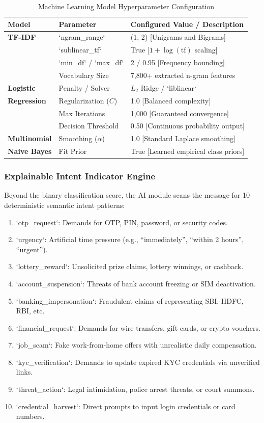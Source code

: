 \documentclass[conference]{IEEEtran}
\begin{document}
\begin{table}[!t]
\centering
\caption{Machine Learning Model Hyperparameter Configuration}
\label{tab:model_config}
\begin{tabular}{|l|l|p{4.5cm}|}
\hline
\textbf{Model} & \textbf{Parameter} & \textbf{Configured Value / Description} \\
\hline
\textbf{TF-IDF} & `ngram\_range` & (1, 2) [Unigrams and Bigrams] \\
& `sublinear\_tf` & True [$1 + \log(\text{tf})$ scaling] \\
& `min\_df` / `max\_df` & 2 / 0.95 [Frequency bounding] \\
& Vocabulary Size & 7,800+ extracted n-gram features \\
\hline
\textbf{Logistic} & Penalty / Solver & $L_2$ Ridge / `liblinear` \\
\textbf{Regression} & Regularization ($C$) & 1.0 [Balanced complexity] \\
& Max Iterations & 1,000 [Guaranteed convergence] \\
& Decision Threshold & 0.50 [Continuous probability output] \\
\hline
\textbf{Multinomial} & Smoothing ($\alpha$) & 1.0 [Standard Laplace smoothing] \\
\textbf{Naive Bayes} & Fit Prior & True [Learned empirical class priors] \\
\hline
\end{tabular}
\end{table}

\subsubsection{Explainable Intent Indicator Engine}
Beyond the binary classification score, the AI module scans the message for 10 deterministic semantic intent patterns:
\begin{enumerate}
    \item `otp_request`: Demands for OTP, PIN, password, or security codes.
    \item `urgency`: Artificial time pressure (e.g., ``immediately'', ``within 2 hours'', ``urgent'').
    \item `lottery_reward`: Unsolicited prize claims, lottery winnings, or cashback.
    \item `account_suspension`: Threats of bank account freezing or SIM deactivation.
    \item `banking_impersonation`: Fraudulent claims of representing SBI, HDFC, RBI, etc.
    \item `financial_request`: Demands for wire transfers, gift cards, or crypto vouchers.
    \item `job_scam`: Fake work-from-home offers with unrealistic daily compensation.
    \item `kyc_verification`: Demands to update expired KYC credentials via unverified links.
    \item `threat_action`: Legal intimidation, police arrest threats, or court summons.
    \item `credential_harvest`: Direct prompts to input login credentials or card numbers.
\end{enumerate}
\end{document}
